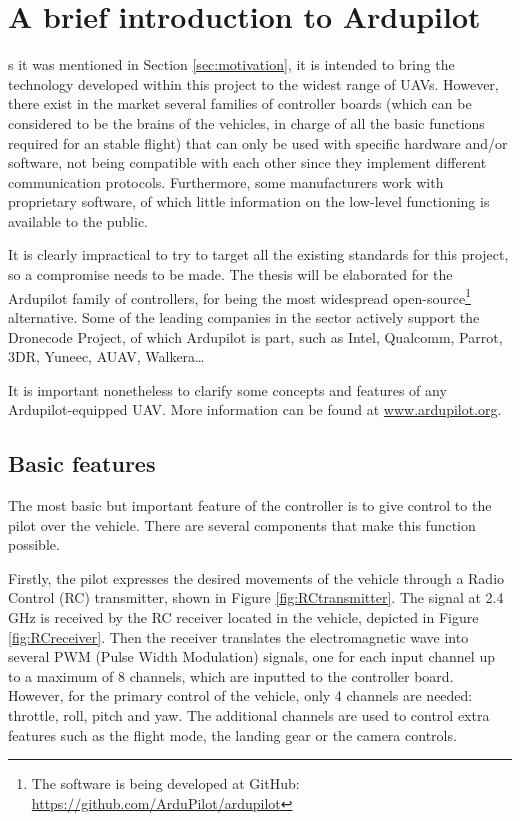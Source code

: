 
\let\textcircled=\pgftextcircled
\chapter{A brief introduction to Ardupilot} \label{chap:ardupilot}

s it was mentioned in Section \ref{sec:motivation}, it is intended to bring the technology developed within this project to the widest range of UAVs.
However, there exist in the market several families of controller boards (which can be considered to be the brains of the vehicles, in charge of all the basic functions required for an stable flight) that can only be used with specific hardware and/or software, not being compatible with each other since they implement different communication protocols.
Furthermore, some manufacturers work with proprietary software, of which little information on the low-level functioning is available to the public.

It is clearly impractical to try to target all the existing standards for this project, so a compromise needs to be made.
The thesis will be elaborated for the Ardupilot family of controllers, for being the most widespread open-source\footnote{The software is being developed at GitHub: \url{https://github.com/ArduPilot/ardupilot}} alternative.
Some of the leading companies \cite{droneindustryinsights2016} in the sector actively support the Dronecode Project, of which Ardupilot is part, such as Intel, Qualcomm, Parrot, 3DR, Yuneec, AUAV, Walkera\ldots \cite{dronecode2016}

It is important nonetheless to clarify some concepts and features of any Ardupilot-equipped UAV.
More information can be found at \url{www.ardupilot.org}.

\section{Basic features} \label{sec:basics}

The most basic but important feature of the controller is to give control to the pilot over the vehicle.
There are several components that make this function possible.

Firstly, the pilot expresses the desired movements of the vehicle through a Radio Control (RC) transmitter, shown in Figure \ref{fig:RCtransmitter}.
The signal at 2.4 GHz is received by the RC receiver located in the vehicle, depicted in Figure \ref{fig:RCreceiver}.
Then the receiver translates the electromagnetic wave into several PWM (Pulse Width Modulation) signals, one for each input channel up to a maximum of 8 channels, which are inputted to the controller board.
However, for the primary control of the vehicle, only 4 channels are needed: throttle, roll, pitch and yaw.
The additional channels are used to control extra features such as the flight mode, the landing gear or the camera controls.

